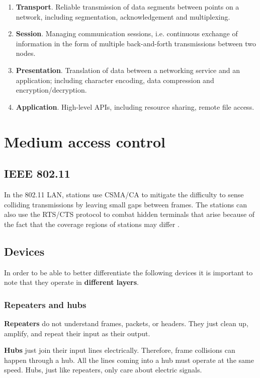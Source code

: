 \documentclass[12pt, oneside]{book}
\begin{document}
\begin{enumerate}
\item \textbf{Transport}. Reliable transmission of data segments between points on a network, including segmentation, acknowledgement and multiplexing.
\item \textbf{Session}. Managing communication sessions, i.e. continuous exchange of information in the form of multiple back-and-forth transmissions between two nodes.
\item \textbf{Presentation}. Translation of data between a networking service and an application; including character encoding, data compression and encryption/decryption.
\item \textbf{Application}. High-level APIs, including resource sharing, remote file access.
\end{enumerate}

\section{Medium access control}

\subsection{IEEE 802.11}

In the 802.11 LAN, stations use CSMA/CA to mitigate the difficulty to sense colliding transmissions by leaving small gaps between frames. The stations can also use the RTS/CTS protocol to combat hidden terminals that arise because of the fact that the coverage regions of stations may differ  \cite[p.~349]{computer-networks-tanenbaum-2012}.

\subsection{Devices}

In order to be able to better differentiate the following devices it is important to note that they operate in \textbf{different layers}.

\subsubsection{Repeaters and hubs}

\textbf{Repeaters} do not understand frames, packets, or headers.
They just clean up, amplify, and repeat their input as their output.

\textbf{Hubs} just join their input lines electrically.
Therefore, frame collisions can happen through a hub.
All the lines coming into a hub must operate at the same speed.
Hubs, just like repeaters, only care about electric signals.
\end{document}
